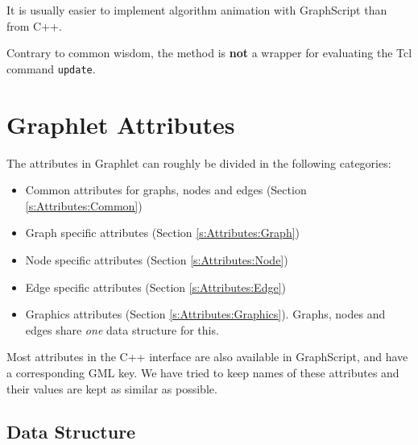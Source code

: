 \documentclass[twoside,fleqn]{report}
\begin{document}
\begin{notes}
  
  \item It is usually easier to implement algorithm animation
  with GraphScript than from C++.
  
  \item Contrary to common wisdom, the method 
  is \textbf{not} a wrapper for evaluating the Tcl command
  \texttt{update}.

\end{notes}


%
%


\chapter{Graphlet Attributes}
\label{c:Attributes}

The attributes in Graphlet can roughly be divided in the following 
categories:

\begin{itemize}

  \item Common attributes for graphs, nodes and edges (Section
  \ref{s:Attributes:Common})

  \item Graph specific attributes (Section
  \ref{s:Attributes:Graph})

  \item Node specific attributes (Section
  \ref{s:Attributes:Node})

  \item Edge specific attributes (Section \ref{s:Attributes:Edge})
  
  \item Graphics attributes (Section
  \ref{s:Attributes:Graphics}). Graphs, nodes and edges share
  \emph{one} data structure for this.

\end{itemize}

Most attributes in the C++ interface are also available in
GraphScript, and have a corresponding GML key. We have tried to
keep names of these attributes and their values are kept as
similar as possible.

%
%

\section{Data Structure}
\end{document}
